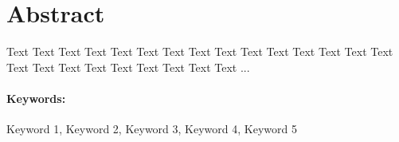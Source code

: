 \section*{\centering Abstract}
Text Text Text Text Text Text Text Text Text Text Text Text Text Text Text Text Text Text Text Text Text Text Text Text ...

\paragraph*{Keywords:} Keyword 1, Keyword 2, Keyword 3, Keyword 4, Keyword 5

\newpage
